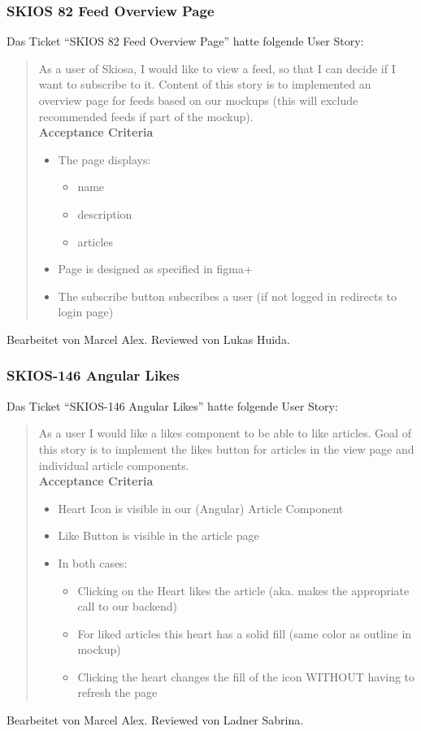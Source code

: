 \subsubsection{SKIOS 82 Feed Overview Page}
Das Ticket \enquote{SKIOS 82 Feed Overview Page} hatte folgende User Story:
\begin{quotation}
As a user of Skiosa, I would like to view a feed, so that I can decide if I want to subscribe to it.
Content of this story is to implemented an overview page for feeds based on our mockups (this will exclude recommended feeds if part of the mockup). \\
\textbf{Acceptance Criteria}
\begin{itemize}
    \item The page displays: 
    \begin{itemize}
        \item name
        \item description
        \item articles
    \end{itemize}
    \item Page is designed as specified in figma+
    \item The subscribe button subscribes a user (if not logged in redirects to login page)
\end{itemize}
\end{quotation}
Bearbeitet von Marcel Alex.
Reviewed von Lukas Huida.

\subsubsection{SKIOS-146 Angular Likes}
Das Ticket \enquote{SKIOS-146 Angular Likes} hatte folgende User Story:
\begin{quotation}
As a user I would like a likes component to be able to like articles.
Goal of this story is to implement the likes button for articles in the view page and individual article components. \\
\textbf{Acceptance Criteria}
\begin{itemize}
    \item Heart Icon is visible in our (Angular) Article Component
    \item Like Button is visible in the article page
    \item In both cases:
    \begin{itemize}
        \item Clicking on the Heart likes the article (aka. makes the appropriate call to our backend)
        \item For liked articles this heart has a solid fill (same color as outline in mockup)
        \item Clicking the heart changes the fill of the icon WITHOUT having to refresh the page
    \end{itemize}
\end{itemize}
\end{quotation}
Bearbeitet von Marcel Alex.
Reviewed von Ladner Sabrina.

